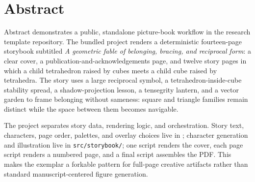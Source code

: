\documentclass[
  ignorenonframetext,
]{beamer}
\author{\texorpdfstring{}{}}
\date{}
\begin{document}
\section{Abstract}\label{abstract}

\begin{frame}{Abstract}
 demonstrates a public, standalone
picture-book workflow in the research template repository. The bundled
project renders a deterministic fourteen-page storybook subtitled
\emph{A geometric fable of belonging, bracing, and reciprocal form}: a
clear cover, a publication-and-acknowledgements page, and twelve story
pages in which a child tetrahedron raised by cubes meets a child cube
raised by tetrahedra. The story uses a large reciprocal symbol, a
tetrahedron-inside-cube stability spread, a shadow-projection lesson, a
tensegrity lantern, and a vector garden to frame belonging without
sameness: square and triangle families remain distinct while the space
between them becomes navigable.

The project separates story data, rendering logic, and orchestration.
Story text, characters, page order, palettes, and overlay choices live
in ; character generation and illustration
live in \texttt{src/storybook/}; one script renders the cover, each page
script renders a numbered page, and a final script assembles the PDF.
This makes the exemplar a forkable pattern for full-page creative
artifacts rather than standard manuscript-centered figure generation.
\end{frame}
\end{document}
